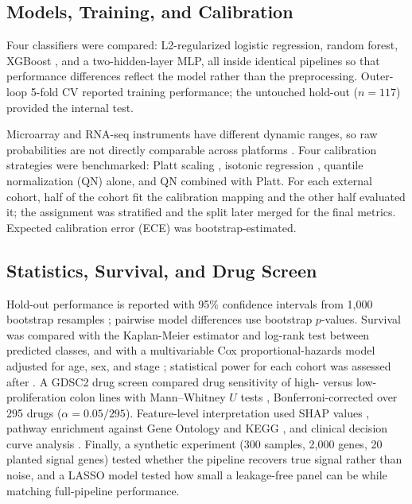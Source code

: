 \documentclass[11pt]{article}
\begin{document}
\subsection{Models, Training, and Calibration}
Four classifiers were compared: L2-regularized logistic regression, random forest, XGBoost \cite{chen2016}, and a two-hidden-layer MLP, all inside identical pipelines so that performance differences reflect the model rather than the preprocessing. Outer-loop 5-fold CV reported training performance; the untouched hold-out ($n=117$) provided the internal test.

Microarray and RNA-seq instruments have different dynamic ranges, so raw probabilities are not directly comparable across platforms \cite{vanclaster2019}. Four calibration strategies were benchmarked: Platt scaling \cite{platt1999}, isotonic regression \cite{zadrozny2002,niculescu2005}, quantile normalization (QN) alone, and QN combined with Platt. For each external cohort, half of the cohort fit the calibration mapping and the other half evaluated it; the assignment was stratified and the split later merged for the final metrics. Expected calibration error (ECE) was bootstrap-estimated.

\subsection{Statistics, Survival, and Drug Screen}
Hold-out performance is reported with 95\% confidence intervals from 1,000 bootstrap resamples \cite{efron1993}; pairwise model differences use bootstrap $p$-values. Survival was compared with the Kaplan-Meier estimator and log-rank test \cite{kaplan1958} between predicted classes, and with a multivariable Cox proportional-hazards model adjusted for age, sex, and stage \cite{cox1972}; statistical power for each cohort was assessed after \cite{schoenfeld1983}. A GDSC2 drug screen \cite{yang2013,iorio2016} compared drug sensitivity of high- versus low-proliferation colon lines with Mann--Whitney $U$ tests \cite{mann1947}, Bonferroni-corrected over 295 drugs ($\alpha = 0.05/295$). Feature-level interpretation used SHAP values \cite{lundberg2017}, pathway enrichment \cite{subramanian2005} against Gene Ontology \cite{ashburner2000} and KEGG \cite{kanehisa2000}, and clinical decision curve analysis \cite{vickers2006}. Finally, a synthetic experiment (300 samples, 2,000 genes, 20 planted signal genes) tested whether the pipeline recovers true signal rather than noise, and a LASSO model \cite{tibshirani1996} tested how small a leakage-free panel can be while matching full-pipeline performance.
\end{document}
